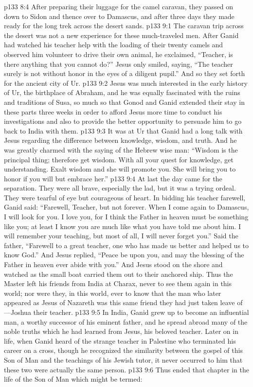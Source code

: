 \vs p133 8:4 After preparing their luggage for the camel caravan, they passed on down to Sidon and thence over to Damascus, and after three days they made ready for the long trek across the desert sands.
\vs p133 9:1 The caravan trip across the desert was not a new experience for these much\hyp{}traveled men. After Ganid had watched his teacher help with the loading of their twenty camels and observed him volunteer to drive their own animal, he exclaimed, “Teacher, is there anything that you cannot do?” Jesus only smiled, saying, \textcolor{ubdarkred}{“The teacher surely is not without honor in the eyes of a diligent pupil.”} And so they set forth for the ancient city of Ur.
\vs p133 9:2 Jesus was much interested in the early history of Ur, the birthplace of Abraham, and he was equally fascinated with the ruins and traditions of Susa, so much so that Gonod and Ganid extended their stay in these parts three weeks in order to afford Jesus more time to conduct his investigations and also to provide the better opportunity to persuade him to go back to India with them.
\vs p133 9:3 It was at Ur that Ganid had a long talk with Jesus regarding the difference between knowledge, wisdom, and truth. And he was greatly charmed with the saying of the Hebrew wise man: \textcolor{ubdarkred}{“Wisdom is the principal thing; therefore get wisdom. With all your quest for knowledge, get understanding. Exalt wisdom and she will promote you. She will bring you to honor if you will but embrace her.”}
\pc \vs p133 9:4 At last the day came for the separation. They were all brave, especially the lad, but it was a trying ordeal. They were tearful of eye but courageous of heart. In bidding his teacher farewell, Ganid said: “Farewell, Teacher, but not forever. When I come again to Damascus, I will look for you. I love you, for I think the Father in heaven must be something like you; at least I know you are much like what you have told me about him. I will remember your teaching, but most of all, I will never forget you.” Said the father, “Farewell to a great teacher, one who has made us better and helped us to know God.” And Jesus replied, \textcolor{ubdarkred}{“Peace be upon you, and may the blessing of the Father in heaven ever abide with you.”} And Jesus stood on the shore and watched as the small boat carried them out to their anchored ship. Thus the Master left his friends from India at Charax, never to see them again in this world; nor were they, in this world, ever to know that the man who later appeared as Jesus of Nazareth was this same friend they had just taken leave of---Joshua their teacher.
\vs p133 9:5 In India, Ganid grew up to become an influential man, a worthy successor of his eminent father, and he spread abroad many of the noble truths which he had learned from Jesus, his beloved teacher. Later on in life, when Ganid heard of the strange teacher in Palestine who terminated his career on a cross, though he recognized the similarity between the gospel of this Son of Man and the teachings of his Jewish tutor, it never occurred to him that these two were actually the same person.\plusone
\pc \vs p133 9:6 Thus ended that chapter in the life of the Son of Man which might be termed: 
